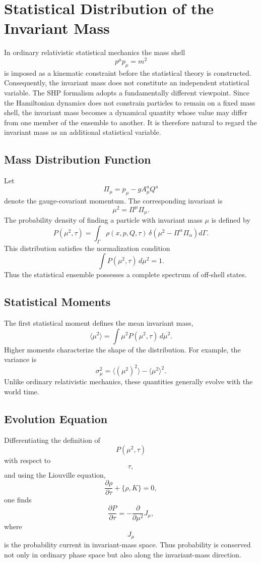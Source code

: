 \section{Statistical Distribution of the Invariant Mass}
In ordinary relativistic statistical mechanics the mass shell
\[p^\mu p_\mu = m^2\]
is imposed as a kinematic constraint before the statistical theory is
constructed. Consequently, the invariant mass does not constitute an
independent statistical variable.
The SHP formalism adopts a fundamentally different viewpoint. Since the
Hamiltonian dynamics does not constrain particles to remain on a fixed
mass shell, the invariant mass becomes a dynamical quantity whose value
may differ from one member of the ensemble to another.
It is therefore natural to regard the invariant mass as an additional
statistical variable.
\subsection{Mass Distribution Function}
Let
\[\Pi_\mu=p_\mu-gA_\mu^aQ^a\]
denote the gauge-covariant momentum.
The corresponding invariant is
\[\mu^2=\Pi^\mu\Pi_\mu .\]
The probability density of finding a particle with invariant mass
\(\mu\) is defined by
\[\boxed{P(\mu^2,\tau)=\int_\Gamma\rho(x,p,Q,\tau)\,\delta\!\left(\mu^2
-\Pi^\alpha\Pi_\alpha\right)d\Gamma.}\]
This distribution satisfies the normalization condition
\[\boxed{\int P(\mu^2,\tau)\,d\mu^2=1.}\]
Thus the statistical ensemble possesses a complete spectrum of
off-shell states.
\subsection{Statistical Moments}
The first statistical moment defines the mean invariant mass,
\[\boxed{\langle\mu^2\rangle=\int\mu^2P(\mu^2,\tau)\,d\mu^2.}\]
Higher moments characterize the shape of the distribution.
For example,
the variance is
\[\boxed{\sigma_\mu^2=\langle(\mu^2)^2\rangle-\langle\mu^2\rangle^2.}\]
Unlike ordinary relativistic mechanics,
these quantities generally evolve with the world time.
\subsection{Evolution Equation}
Differentiating the definition of
\[P(\mu^2,\tau)\]
with respect to
\[\tau,\]
and using the Liouville equation,
\[\frac{\partial\rho}{\partial\tau}+\{\rho,K\}=0,\]
one finds
\[\frac{\partial P}{\partial\tau}=-\frac{\partial}{\partial\mu^2}J_\mu,\]
where
\[J_\mu\]
is the probability current in invariant-mass space.
Thus probability is conserved not only in ordinary phase space but also
along the invariant-mass direction.
